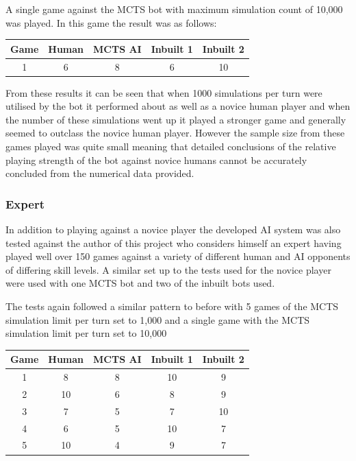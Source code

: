 \documentclass[]{article}
\begin{document}
A single game against the MCTS bot with maximum simulation count of 10,000 was played. In this game the result was as follows: 

\begin{center}
\begin{tabular}{|c||c|c|c|c|}
\hline
Game & Human & MCTS AI & Inbuilt 1 & Inbuilt 2\\
\hline
1 & 6 & 8 & 6 & 10\\
\hline
\end{tabular}

\end{center}

\par From these results it can be seen that when 1000 simulations per turn were utilised by the bot it performed about as well as a novice human player and when the number of these simulations went up it played a stronger game and generally seemed to outclass the novice human player. However the sample size from these games played was quite small meaning that detailed conclusions of the relative playing strength of the bot against novice humans cannot be accurately concluded from the numerical data provided.

\subsubsection{Expert}
In addition to playing against a novice player the developed AI system was also tested against the author of this project who considers himself an expert having played well over 150 games against a variety of different human and AI opponents of differing skill levels. A similar set up to the tests used for the novice player were used with one MCTS bot and two of the inbuilt bots used.

\par The tests again followed a similar pattern to before with 5 games of the MCTS simulation limit per turn set to 1,000 and a single game with the MCTS simulation limit per turn set to 10,000 

\begin{center}
\begin{tabular}{|c||c|c|c|c|}
\hline
Game & Human & MCTS AI & Inbuilt 1 & Inbuilt 2\\
\hline
1 & 8 & 8 & 10 & 9 \\
\hline
2 & 10 & 6 & 8 & 9 \\
\hline
3 & 7 & 5 & 7 & 10\\
\hline
4 & 6 & 5 & 10 & 7 \\
\hline
5 & 10 & 4 & 9 & 7 \\
\hline
\end{tabular}
\end{center}
\end{document}

